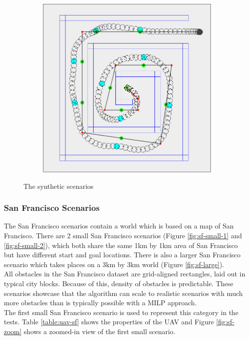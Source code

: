 \begin{figure}
	\begin{subfigure}[t]{0.5\textwidth}
        		\includegraphics[width=\textwidth]{img/spiral}
        		\caption{}
        		\label{fig:spiral}
	\end{subfigure}
        
    \caption{The synthetic scenarios}\label{fig:synth-scens}
\end{figure}
\clearpage
\subsubsection{San Francisco Scenarios}
\label{subsec:sf}
The San Francisco scenarios contain a world which is based on a map of San Francisco. There are 2 small San Francisco scenarios (Figure \ref{fig:sf-small-1} and \ref{fig:sf-small-2}), which both share the same 1km by 1km area of San Francisco but have different start and goal locations. There is also a larger San Francisco scenario which takes places on a 3km by 3km world (Figure \ref{fig:sf-large}). \\
All obstacles in the San Francisco dataset are grid-aligned rectangles, laid out in typical city blocks. Because of this, density of obstacles is predictable. These scenarios showcase that the algorithm can scale to realistic scenarios with much more obstacles than is typically possible with a MILP approach. \\
The first small San Francisco scenario is used to represent this category in the tests. Table \ref{table:uav-sf} shows the properties of the UAV and Figure \ref{fig:sf-zoom} shows a zoomed-in view of the first small scenario. 


